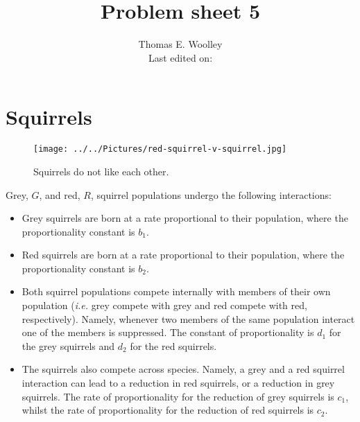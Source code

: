 \documentclass[]{article}
\newcommand{\ie}{\emph{i.e.} }
\newcommand{\tbo}{.6\textwidth}
\begin{document}


\title{Problem sheet 5}
\author{Thomas E. Woolley\\Last edited on:}
\maketitle
\section{Squirrels}
\begin{figure}[h!!!tb]
\centering
\texttt{[image: ../../Pictures/red-squirrel-v-squirrel.jpg]}
\caption{Squirrels do not like each other.}
\end{figure}
Grey, $G$, and red, $R$, squirrel populations undergo the following interactions:
\begin{itemize}
\item Grey squirrels are born at a rate proportional to their population, where the proportionality constant is $b_1$.
\item Red squirrels are born at a rate proportional to their population, where the proportionality constant is $b_2$.
\item Both squirrel populations compete internally with members of their own population (\ie grey compete with grey and red compete with red, respectively). Namely, whenever two members of the same population interact one of the members is suppressed. The constant of proportionality is $d_1$ for the grey squirrels and $d_2$ for the red squirrels.
\item The squirrels also compete across species. Namely, a grey and a red squirrel interaction can lead to a reduction in red squirrels, or a reduction in grey squirrels. The rate of proportionality for the reduction of grey squirrels is $c_1$, whilst the rate of proportionality for the reduction of red squirrels is $c_2$.
\end{itemize}
\end{document}
